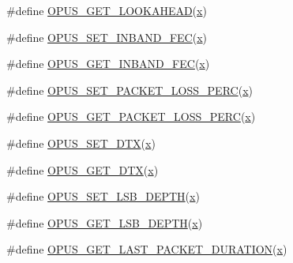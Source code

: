 \begin{DoxyCompactItemize}
\item 
\#define \mbox{\hyperlink{group__opus__encoderctls_gaf81b9e01501910adc67195ebb42b4a54}{O\+P\+U\+S\+\_\+\+G\+E\+T\+\_\+\+L\+O\+O\+K\+A\+H\+E\+AD}}(\mbox{\hyperlink{_s_d_l__opengl_8h_ad0e63d0edcdbd3d79554076bf309fd47}{x}})
\item 
\#define \mbox{\hyperlink{group__opus__encoderctls_ga5b67dc832aa46c1c2f35752c46380545}{O\+P\+U\+S\+\_\+\+S\+E\+T\+\_\+\+I\+N\+B\+A\+N\+D\+\_\+\+F\+EC}}(\mbox{\hyperlink{_s_d_l__opengl_8h_ad0e63d0edcdbd3d79554076bf309fd47}{x}})
\item 
\#define \mbox{\hyperlink{group__opus__encoderctls_gaf792b27a6277ddf786413dbf472d0ac8}{O\+P\+U\+S\+\_\+\+G\+E\+T\+\_\+\+I\+N\+B\+A\+N\+D\+\_\+\+F\+EC}}(\mbox{\hyperlink{_s_d_l__opengl_8h_ad0e63d0edcdbd3d79554076bf309fd47}{x}})
\item 
\#define \mbox{\hyperlink{group__opus__encoderctls_gafda1c951dea919ba54432cd03827f1a9}{O\+P\+U\+S\+\_\+\+S\+E\+T\+\_\+\+P\+A\+C\+K\+E\+T\+\_\+\+L\+O\+S\+S\+\_\+\+P\+E\+RC}}(\mbox{\hyperlink{_s_d_l__opengl_8h_ad0e63d0edcdbd3d79554076bf309fd47}{x}})
\item 
\#define \mbox{\hyperlink{group__opus__encoderctls_gaa79261c6a55444993fca8d3a3a29d519}{O\+P\+U\+S\+\_\+\+G\+E\+T\+\_\+\+P\+A\+C\+K\+E\+T\+\_\+\+L\+O\+S\+S\+\_\+\+P\+E\+RC}}(\mbox{\hyperlink{_s_d_l__opengl_8h_ad0e63d0edcdbd3d79554076bf309fd47}{x}})
\item 
\#define \mbox{\hyperlink{group__opus__encoderctls_ga4f053b2db8c5162293213aabfe123773}{O\+P\+U\+S\+\_\+\+S\+E\+T\+\_\+\+D\+TX}}(\mbox{\hyperlink{_s_d_l__opengl_8h_ad0e63d0edcdbd3d79554076bf309fd47}{x}})
\item 
\#define \mbox{\hyperlink{group__opus__encoderctls_gaafbb44454e9f57232b85e4e087337ded}{O\+P\+U\+S\+\_\+\+G\+E\+T\+\_\+\+D\+TX}}(\mbox{\hyperlink{_s_d_l__opengl_8h_ad0e63d0edcdbd3d79554076bf309fd47}{x}})
\item 
\#define \mbox{\hyperlink{group__opus__encoderctls_gaa23940eb477ff617edc14b8d66e104c0}{O\+P\+U\+S\+\_\+\+S\+E\+T\+\_\+\+L\+S\+B\+\_\+\+D\+E\+P\+TH}}(\mbox{\hyperlink{_s_d_l__opengl_8h_ad0e63d0edcdbd3d79554076bf309fd47}{x}})
\item 
\#define \mbox{\hyperlink{group__opus__encoderctls_gab5ecdfbbbabfaefc2f2ca79cf4a3b08f}{O\+P\+U\+S\+\_\+\+G\+E\+T\+\_\+\+L\+S\+B\+\_\+\+D\+E\+P\+TH}}(\mbox{\hyperlink{_s_d_l__opengl_8h_ad0e63d0edcdbd3d79554076bf309fd47}{x}})
\item 
\#define \mbox{\hyperlink{group__opus__encoderctls_ga8f3d070f56b75f2a7af54e5776b387fa}{O\+P\+U\+S\+\_\+\+G\+E\+T\+\_\+\+L\+A\+S\+T\+\_\+\+P\+A\+C\+K\+E\+T\+\_\+\+D\+U\+R\+A\+T\+I\+ON}}(\mbox{\hyperlink{_s_d_l__opengl_8h_ad0e63d0edcdbd3d79554076bf309fd47}{x}})
\end{DoxyCompactItemize}


